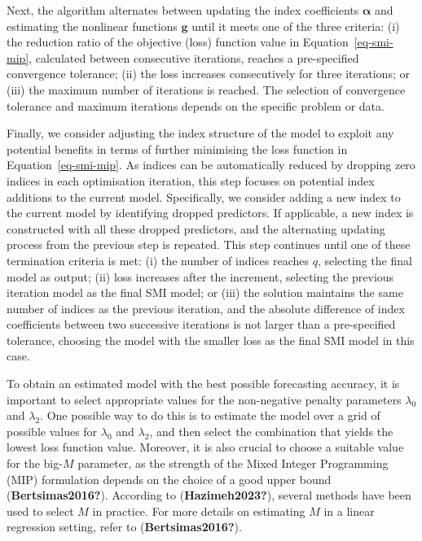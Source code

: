 \documentclass[
  11pt,
  a4paper,
]{report}
\begin{document}
Next, the algorithm alternates between updating the index coefficients
\(\bm{\alpha}\) and estimating the nonlinear functions \(\bm{g}\) until
it meets one of the three criteria: (i) the reduction ratio of the
objective (loss) function value in Equation~\ref{eq-smi-mip}, calculated
between consecutive iterations, reaches a pre-specified convergence
tolerance; (ii) the loss increases consecutively for three iterations;
or (iii) the maximum number of iterations is reached. The selection of
convergence tolerance and maximum iterations depends on the specific
problem or data.

Finally, we consider adjusting the index structure of the model to
exploit any potential benefits in terms of further minimising the loss
function in Equation~\ref{eq-smi-mip}. As indices can be automatically
reduced by dropping zero indices in each optimisation iteration, this
step focuses on potential index additions to the current model.
Specifically, we consider adding a new index to the current model by
identifying dropped predictors. If applicable, a new index is
constructed with all these dropped predictors, and the alternating
updating process from the previous step is repeated. This step continues
until one of these termination criteria is met: (i) the number of
indices reaches \(q\), selecting the final model as output; (ii) loss
increases after the increment, selecting the previous iteration model as
the final SMI model; or (iii) the solution maintains the same number of
indices as the previous iteration, and the absolute difference of index
coefficients between two successive iterations is not larger than a
pre-specified tolerance, choosing the model with the smaller loss as the
final SMI model in this case.

To obtain an estimated model with the best possible forecasting
accuracy, it is important to select appropriate values for the
non-negative penalty parameters \(\lambda_{0}\) and \(\lambda_{2}\). One
possible way to do this is to estimate the model over a grid of possible
values for \(\lambda_{0}\) and \(\lambda_{2}\), and then select the
combination that yields the lowest loss function value. Moreover, it is
also crucial to choose a suitable value for the big-\(M\) parameter, as
the strength of the Mixed Integer Programming (MIP) formulation depends
on the choice of a good upper bound (\textbf{Bertsimas2016?}). According
to (\textbf{Hazimeh2023?}), several methods have been used to select
\(M\) in practice. For more details on estimating \(M\) in a linear
regression setting, refer to (\textbf{Bertsimas2016?}).
\end{document}
